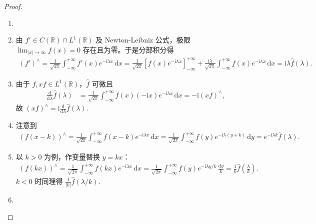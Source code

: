 \documentclass[../../main.tex]{subfiles}%
\begin{document}
\begin{proof}
\begin{enumerate}[(1)]
\item 

\item 由 $f'\in C(\mathbb{R})\cap L^1(\mathbb{R})$ 及 Newton-Leibniz 公式，极限 $\lim_{|x|\to\infty}f(x)=0$ 存在且为零。于是分部积分得
\begin{align*}
(f')^\wedge
=\frac{1}{\sqrt{2\pi}}\int_{-\infty}^{+\infty}f'(x)e^{-\mathrm{i}\lambda x}\,\mathrm{d}x 
=\frac{1}{\sqrt{2\pi}}\left[f(x)e^{-\mathrm{i}\lambda x}\right]_{-\infty}^{+\infty}
+\frac{\mathrm{i}\lambda}{\sqrt{2\pi}}\int_{-\infty}^{+\infty}f(x)e^{-\mathrm{i}\lambda x}\,\mathrm{d}x 
=\mathrm{i}\lambda \hat{f}(\lambda).
\end{align*} 

\item  由于 $f,xf\in L^1(\mathbb{R})$，$\hat{f}$ 可微且
\begin{align*}
\frac{\mathrm{d}}{\mathrm{d}\lambda}\hat{f}(\lambda)
&=\frac{1}{\sqrt{2\pi}}\int_{-\infty}^{+\infty}f(x)(-\mathrm{i}x)e^{-\mathrm{i}\lambda x}\,\mathrm{d}x
=-\mathrm{i}(xf)^\wedge,
\end{align*}
故 $(xf)^\wedge=\mathrm{i}\frac{\mathrm{d}}{\mathrm{d}\lambda}\hat{f}(\lambda)$.

\item 注意到
\begin{align*}
(f(x-k))^\wedge
=\frac{1}{\sqrt{2\pi}}\int_{-\infty}^{+\infty}f(x-k)e^{-\mathrm{i}\lambda x}\,\mathrm{d}x 
=\frac{1}{\sqrt{2\pi}}\int_{-\infty}^{+\infty}f(y)e^{-\mathrm{i}\lambda(y+k)}\,\mathrm{d}y
=e^{-\mathrm{i}\lambda k}\hat{f}(\lambda).
\end{align*}

\item  以 $k>0$ 为例，作变量替换 $y=kx$：
\begin{align*}
(f(kx))^\wedge
=\frac{1}{\sqrt{2\pi}}\int_{-\infty}^{+\infty}f(kx)e^{-\mathrm{i}\lambda x}\,\mathrm{d}x 
=\frac{1}{\sqrt{2\pi}}\int_{-\infty}^{+\infty}f(y)e^{-\mathrm{i}\lambda y/k}\,\frac{\mathrm{d}y}{k}
=\frac{1}{k}\hat{f}\left(\frac{\lambda}{k}\right).
\end{align*}
$k<0$ 时同理得 $\frac{1}{|k|}\hat{f}(\lambda/k)$.

\item  


\end{enumerate}
\end{proof}
\end{document}
